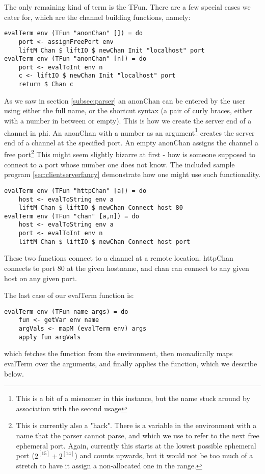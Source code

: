 The only remaining kind of term is the TFun. There are a few special cases we cater for, which are the channel building functions, namely:
\begin{verbatim}
evalTerm env (TFun "anonChan" []) = do
    port <- assignFreePort env
    liftM Chan $ liftIO $ newChan Init "localhost" port 
evalTerm env (TFun "anonChan" [n]) = do
    port <- evalToInt env n
    c <- liftIO $ newChan Init "localhost" port 
    return $ Chan c
\end{verbatim}
As we saw in section \ref{subsec:parser} an anonChan can be entered by the user using either the full name, or the shortcut syntax (a pair of curly braces, either with a number in between or empty). This is how we create the server end of a channel in phi. An anonChan with a number as an argument\footnote{This is a bit of a misnomer in this instance, but the name stuck around by association with the second usage} creates the server end of a channel at the specified port. An empty anonChan assigns the channel a free port\footnote{This is currently also a "hack". There is a variable in the environment with a name that the parser cannot parse, and which we use to refer to the next free ephemeral
port. Again, currently this starts at the lowest possible ephemeral port ($2^[15]+2^[14]$) and counts upwards, but it would not be too much of a stretch to have it assign a non-allocated one in the range.} This might seem slightly bizarre at first - how is someone supposed to connect to a port whose number one does not know. The included sample program \ref{sec:clientserverfancy} demonstrate how one might use such functionality.
\begin{verbatim}
evalTerm env (TFun "httpChan" [a]) = do
    host <- evalToString env a
    liftM Chan $ liftIO $ newChan Connect host 80
evalTerm env (TFun "chan" [a,n]) = do
    host <- evalToString env a
    port <- evalToInt env n
    liftM Chan $ liftIO $ newChan Connect host port
\end{verbatim}
These two functions connect to a channel at a remote location. httpChan connects to port 80 at the given hostname, and chan can connect to any given host on any given port.

The last case of our evalTerm function is:
\begin{verbatim}
evalTerm env (TFun name args) = do
    fun <- getVar env name
    argVals <- mapM (evalTerm env) args
    apply fun argVals
\end{verbatim}
which fetches the function from the environment, then monadically maps evalTerm over the arguments, and finally applies the function, which we describe below.


